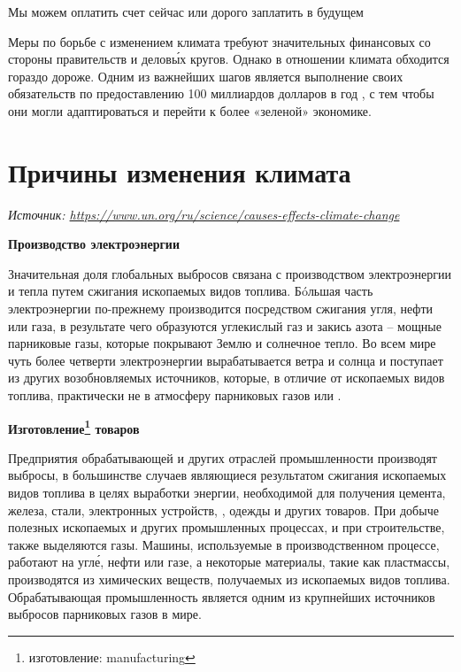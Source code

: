 \begin{fancyquotes}
    Мы можем оплатить счет сейчас или дорого заплатить в будущем
\end{fancyquotes}

Меры по борьбе с изменением климата требуют значительных финансовых  со стороны правительств и делов\'{ы}х кругов. Однако  в отношении климата обходится гораздо дороже. Одним из важнейших шагов является выполнение  своих обязательств по предоставлению 100 миллиардов долларов в год , с тем чтобы они могли адаптироваться и перейти к более «зеленой» экономике.



\section{Причины изменения климата}
\textit{Источник: \url{https://www.un.org/ru/science/causes-effects-climate-change}}



\textbf{Производство электроэнергии}

Значительная доля глобальных выбросов связана с производством электроэнергии и тепла путем сжигания ископаемых видов топлива. Бóльшая часть электроэнергии по-прежнему производится посредством сжигания угля, нефти или газа, в результате чего образуются углекислый газ и закись азота – мощные парниковые газы, которые покрывают Землю и  солнечное тепло. Во всем мире чуть более четверти электроэнергии вырабатывается  ветра и солнца и поступает из других возобновляемых источников, которые, в отличие от ископаемых видов топлива, практически не  в атмосферу парниковых газов или .

\textbf{Изготовление\footnote{изготовление: manufacturing} товаров}

Предприятия обрабатывающей и других отраслей промышленности производят выбросы, в большинстве случаев являющиеся результатом сжигания ископаемых видов топлива в целях выработки энергии, необходимой для получения цемента, железа, стали, электронных устройств, , одежды и других товаров.
При добыче полезных ископаемых и других промышленных процессах,  и при строительстве, также выделяются газы. Машины, используемые в производственном процессе,  работают на угл\'{е}, нефти или газе, а некоторые материалы, такие как пластмассы, производятся из химических веществ, получаемых из ископаемых видов топлива. Обрабатывающая промышленность является одним из крупнейших источников выбросов парниковых газов в мире.

